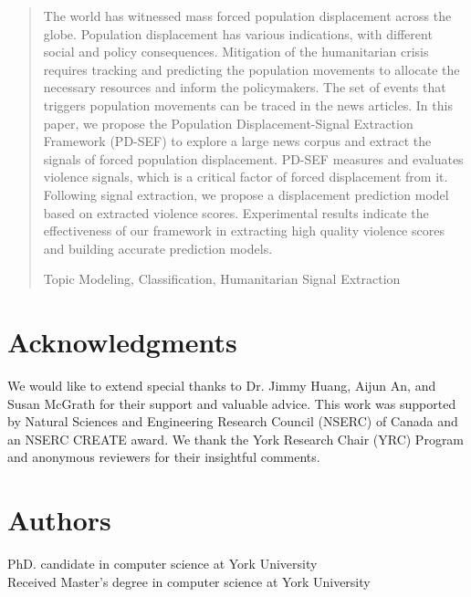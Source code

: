 \documentclass[11pt,letterpaper]{llncs}
\newcommand{\keywords}[1]{\par\addvspace\baselineskip
\noindent\keywordname\enspace\ignorespaces#1}
\begin{document}
\thispagestyle{firstpage}


\begin{abstract}
The world has witnessed mass forced population displacement across the globe. Population displacement has various indications, with different social and policy consequences.  Mitigation of the humanitarian crisis requires tracking and predicting the population movements to allocate the necessary resources and inform the policymakers. The set of events that triggers population movements can be traced in the news articles. In this paper, we propose the Population Displacement-Signal Extraction Framework (PD-SEF) to explore a large news corpus and extract the signals of forced population displacement. PD-SEF measures and evaluates violence signals, which is a critical factor of forced displacement from it. Following signal extraction, we propose a displacement prediction model based on extracted violence scores. Experimental results indicate the effectiveness of our framework in extracting high quality violence scores and building accurate prediction models. 
\keywords{Topic Modeling, Classification, Humanitarian Signal Extraction}
\end{abstract}




\section*{Acknowledgments} We would like to extend special thanks to Dr. Jimmy Huang, Aijun An, and Susan McGrath for their support and valuable advice. This work was supported by Natural Sciences and Engineering Research Council (NSERC) of Canada and an NSERC CREATE award. We thank the York Research Chair (YRC) Program and anonymous reviewers for their insightful comments.
 
% 





\vspace{2cm}

\section*{Authors}
 PhD. candidate in computer science at York University \\

 Received Master's degree in computer science at York University \\
\end{document}

